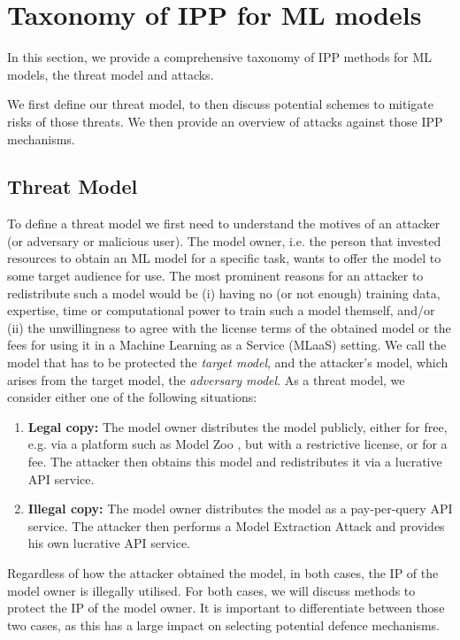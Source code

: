 \chapter{Taxonomy of IPP for ML models}
\label{ch:taxonomy}



In this section, we provide a comprehensive taxonomy of IPP methods for ML models, the threat model and attacks.

We first define our threat model, to then discuss potential schemes to mitigate risks of those threats.
We then provide an overview of attacks against those IPP mechanisms.

\section{Threat Model}
\label{sec:threatmodel}

To define a threat model we first need to understand the motives of an attacker (or adversary or malicious user).
The model owner, i.e. the person that invested resources to obtain an ML model for a specific task, wants to offer the model to some target audience for use.
The most prominent reasons for an attacker to redistribute such a model would be (i) having no (or not enough) training data, expertise, time or computational power to train such a model themself, and/or (ii) the unwillingness to agree with the license terms of the obtained model or the fees for using it in a Machine Learning as a Service (MLaaS) setting.
We call the model that has to be protected the \textit{target model}, and the attacker's model, which arises from the target model, the \textit{adversary model}. As a threat model, we consider either one of the following situations:
% 
\begin{enumerate}
    \item \textbf{Legal copy:} The model owner distributes the model publicly, either for free, e.g. via a platform such as Model Zoo \cite{noauthor_model_nodate}, but with a restrictive license, or for a fee. The attacker then obtains this model and redistributes it via a lucrative API service.
    \item \textbf{Illegal copy:} The model owner distributes the model as a pay-per-query API service. The attacker then performs a Model Extraction Attack and provides his own lucrative API service.
\end{enumerate}

Regardless of how the attacker obtained the model, in both cases, the IP of the model owner is illegally utilised. For both cases, we will discuss methods to protect the IP of the model owner. It is important to differentiate between those two cases, as this has a large impact on selecting potential defence mechanisms. 


